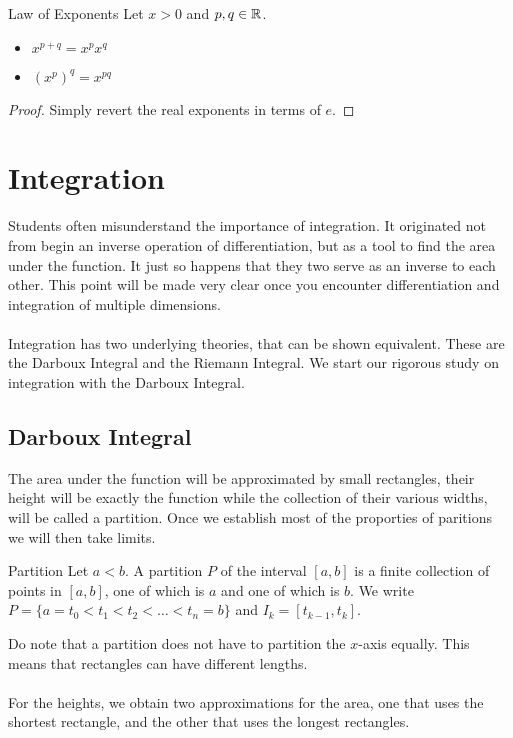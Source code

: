 \documentclass[a4paper]{article}
\begin{document}
\begin{thm}{Law of Exponents}{} Let $x>0$ and $p,q\in\mathbb{R}$. 
\begin{itemize}
\item $x^{p+q}=x^px^q$
\item $(x^p)^q=x^{pq}$
\end{itemize}\tcbline
\begin{proof} Simply revert the real exponents in terms of $e$. 
\end{proof}
\end{thm}

\pagebreak
\section{Integration}
Students often misunderstand the importance of integration. It originated not from begin an inverse operation of differentiation, but as a tool to find the area under the function. It just so happens that they two serve as an inverse to each other. This point will be made very clear once you encounter differentiation and integration of multiple dimensions. \\~\\
Integration has two underlying theories, that can be shown equivalent. These are the Darboux Integral and the Riemann Integral. We start our rigorous study on integration with the Darboux Integral. 
\subsection{Darboux Integral}
The area under the function will be approximated by small rectangles, their height will be exactly the function while the collection of their various widths, will be called a partition. Once we establish most of the proporties of paritions we will then take limits. 
\begin{defn}{Partition}{} Let $a<b$. A partition $P$ of the interval $[a,b]$ is a finite collection of points in $[a,b]$, one of which is $a$ and one of which is $b$. We write $P=\{a=t_0<t_1<t_2<\dots<t_n=b\}$ and $I_k=[t_{k-1},t_k]$. 
\end{defn}

Do note that a partition does not have to partition the $x$-axis equally. This means that rectangles can have different lengths. \\~\\
For the heights, we obtain two approximations for the area, one that uses the shortest rectangle, and the other that uses the longest rectangles. 
\end{document}
